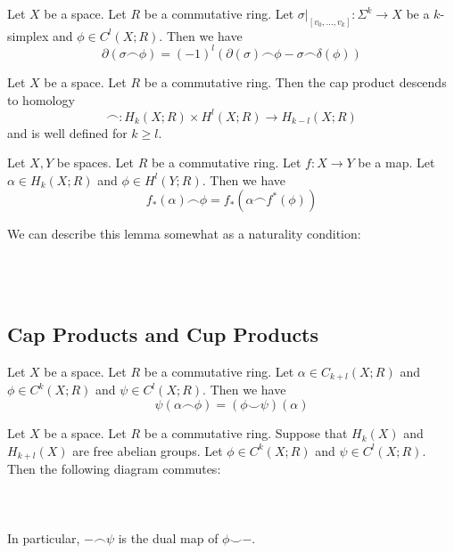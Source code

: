 \documentclass[a4paper]{article}
\begin{document}
\begin{lmm}{}{} Let $X$ be a space. Let $R$ be a commutative ring. Let $\sigma|_[v_0,\dots,v_k]:\Sigma^k\to X$ be a $k$-simplex and $\phi\in C^l(X;R)$. Then we have $$\partial(\sigma\frown\phi)=(-1)^l(\partial(\sigma)\frown\phi-\sigma\frown\delta(\phi))$$
\end{lmm}

\begin{prp}{}{} Let $X$ be a space. Let $R$ be a commutative ring. Then the cap product descends to homology $$\frown:H_k(X;R)\times H^l(X;R)\to H_{k-l}(X;R)$$ and is well defined for $k\geq l$.
\end{prp}

\begin{lmm}{}{} Let $X,Y$ be spaces. Let $R$ be a commutative ring. Let $f:X\to Y$ be a map. Let $\alpha\in H_k(X;R)$ and $\phi\in H^l(Y;R)$. Then we have $$f_\ast(\alpha)\frown\phi=f_\ast(\alpha\frown f^\ast(\phi))$$
\end{lmm}

We can describe this lemma somewhat as a naturality condition: \\~\\
\\~\\

\subsection{Cap Products and Cup Products}
\begin{lmm}{}{} Let $X$ be a space. Let $R$ be a commutative ring. Let $\alpha\in C_{k+l}(X;R)$ and $\phi\in C^k(X;R)$ and $\psi\in C^l(X;R)$. Then we have $$\psi(\alpha\frown\phi)=(\phi\smile\psi)(\alpha)$$
\end{lmm}

\begin{prp}{}{} Let $X$ be a space. Let $R$ be a commutative ring. Suppose that $H_k(X)$ and $H_{k+l}(X)$ are free abelian groups. Let $\phi\in C^k(X;R)$ and $\psi\in C^l(X;R)$. Then the following diagram commutes: \\~\\
\\~\\
In particular, $-\frown\psi$ is the dual map of $\phi\smile-$. 
\end{prp}
\end{document}
